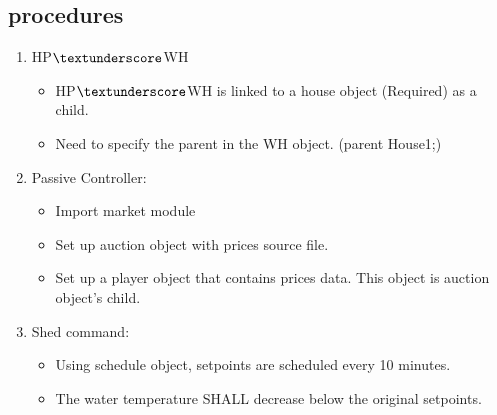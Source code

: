 \subsection{procedures}
    \begin{enumerate}
        \item HP$\textunderscore$WH
        \begin{itemize}
            \item HP$\textunderscore$WH is linked to a house object (Required) as a child.
            \item Need to specify the parent in the WH object. (parent House1;) 
        \end{itemize}
        \item Passive Controller:
        \begin{itemize}
            \item Import market module
            \item Set up auction object with prices source file.
            \item Set up a player object that contains prices data. This object is auction object's child.
        \end{itemize}
        \item Shed command:
        \begin{itemize}
            \item Using schedule object, setpoints are scheduled every 10 minutes.
            \item The water temperature SHALL decrease below the original setpoints. 
        \end{itemize}
    \end{enumerate}

